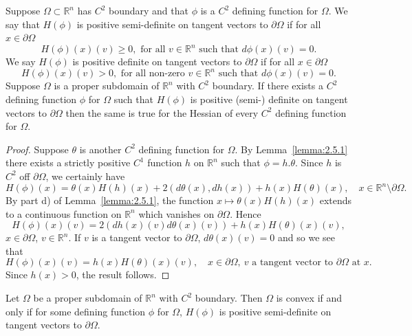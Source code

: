 Suppose $\Omega\subset\mathbb R^n$ has $C^2$ boundary and that $\phi$ is a $C^2$ defining function for $\Omega$. We say that $H(\phi)$ is positive semi-definite on tangent vectors to $\partial\Omega$ if for all $x\in\partial\Omega$
\[H(\phi)(x)(v)\geq0,\text{ for all }v\in\mathbb R^n\text{ such that }d\phi(x)(v)=0.\]
We say $H(\phi)$ is positive definite on tangent vectors to $\partial\Omega$ if for all $x\in\partial\Omega$
\[H(\phi)(x)(v)>0,\text{ for all non-zero }v\in\mathbb R^n\text{ such that }d\phi(x)(v)=0.\]
 Suppose $\Omega$ is a proper subdomain of $\mathbb R^n$ with $C^2$ boundary. If there exists a $C^2$ defining function $\phi$ for $\Omega$ such that $H(\phi)$ is positive (semi-) definite on tangent vectors to $\partial\Omega$ then the same is true for the Hessian of every $C^2$ defining function for $\Omega$.
\begin{proof}
Suppose $\theta$ is another $C^2$ defining function for $\Omega$. By Lemma~\ref{lemma:2.5.1} there exists a strictly positive $C^1$ function $h$ on $\mathbb R^n$ such that $\phi=h.\theta$. Since $h$ is $C^2$ off $\partial\Omega$, we certainly have
\[H(\phi)(x)=\theta(x)H(h)(x)+2(d\theta(x),dh(x))+h(x)H(\theta)(x),\quad x\in\mathbb R^n\setminus\partial\Omega.\]
By part d) of Lemma~\ref{lemma:2.5.1}, the function $x\mapsto\theta(x)H(h)(x)$ extends to a continuous function on $\mathbb R^n$ which vanishes on $\partial\Omega$. Hence
\[H(\phi)(x)(v)=2(dh(x)(v)d\theta(x)(v))+h(x)H(\theta)(x)(v),\]
$x\in\partial\Omega$, $v\in\mathbb R^n$. If $v$ is a tangent vector to $\partial\Omega$, $d\theta(x)(v)=0$ and so we see that
\[H(\phi)(x)(v)=h(x)H(\theta)(x)(v),\quad x\in\partial\Omega,\ v\text{ a tangent vector to }\partial\Omega\text{ at }x.\]
Since $h(x)>0$, the result follows.
\end{proof}
 Let $\Omega$ be a proper subdomain of $\mathbb R^n$ with $C^2$ boundary. Then $\Omega$ is convex if and only if for some defining function $\phi$ for $\Omega$, $H(\phi)$ is positive semi-definite on tangent vectors to $\partial\Omega$.
